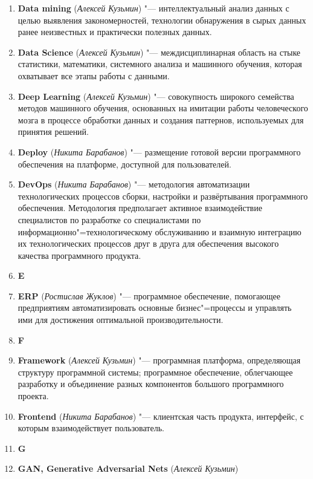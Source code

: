 \documentclass[a4paper, 14 pt]{extarticle}
\begin{document}
\begin{enumerate}
    \item \textbf{Data mining} (\textit{Алексей Кузьмин}) "--- интеллектуальный 
    анализ данных с целью выявления закономерностей, технологии обнаружения в 
    сырых данных ранее неизвестных и практически полезных данных.
    \item \textbf{Data Science} (\textit{Алексей Кузьмин}) "--- 
    междисциплинарная область на стыке статистики, математики, системного 
    анализа и машинного обучения, которая охватывает все этапы работы с данными.
    \item \textbf{Deep Learning} (\textit{Алексей Кузьмин}) "--- совокупность 
    широкого семейства методов машинного обучения, основанных на имитации работы
    человеческого мозга в процессе обработки данных и создания паттернов, 
    используемых для принятия решений. 
    \item \textbf{Deploy} (\textit{Никита Барабанов}) "--- размещение 
    готовой версии программного обеспечения на платформе, доступной для 
    пользователей.
    \item \textbf{DevOps} (\textit{Никита Барабанов}) "---  методология 
    автоматизации технологических процессов сборки, настройки и развёртывания 
    программного обеспечения. Методология предполагает активное взаимодействие 
    специалистов по разработке со специалистами по 
    информационно"=технологическому обслуживанию и взаимную интеграцию их 
    технологических процессов друг в друга для обеспечения высокого качества
    программного продукта.
    \item[] \textbf{E}
    \item \textbf{ERP} (\textit{Ростислав Жуклов}) "--- программное 
    обеспечение, помогающее предприятиям автоматизировать основные 
    бизнес"=процессы и управлять ими для достижения оптимальной 
    производительности. 
    \item[] \textbf{F}
    \item \textbf{Framework} (\textit{Алексей Кузьмин}) "--- программная 
    платформа, определяющая структуру программной системы; программное 
    обеспечение, облегчающее разработку и объединение разных компонентов 
    большого программного проекта.
    \item \textbf{Frontend} (\textit{Никита Барабанов}) "--- клиентская часть 
    продукта, интерфейс, с которым взаимодействует пользователь.
    \item[] \textbf{G}
    \item \textbf{GAN, Generative Adversarial Nets} (\textit{Алексей Кузьмин}) 

\end{enumerate}
\end{document}
